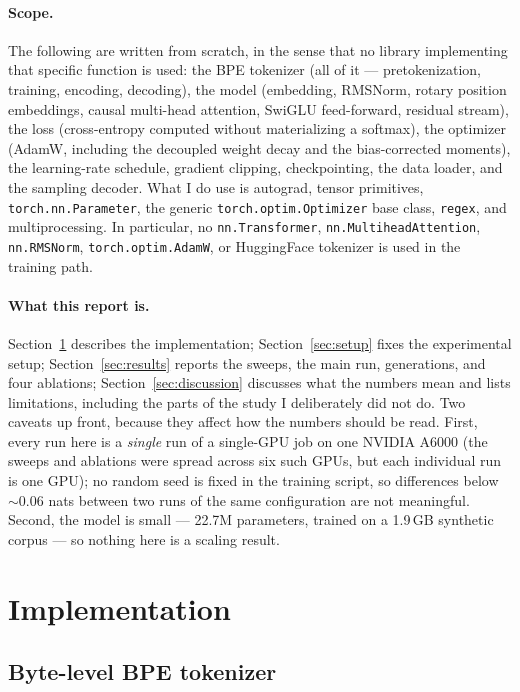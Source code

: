 \documentclass{article}
\begin{document}
\paragraph{Scope.} The following are written from scratch, in the sense that no library implementing that specific function is used: the BPE tokenizer (all of it --- pretokenization, training, encoding, decoding), the model (embedding, RMSNorm, rotary position embeddings, causal multi-head attention, SwiGLU feed-forward, residual stream), the loss (cross-entropy computed without materializing a softmax), the optimizer (AdamW, including the decoupled weight decay and the bias-corrected moments), the learning-rate schedule, gradient clipping, checkpointing, the data loader, and the sampling decoder. What I do use is autograd, tensor primitives, \texttt{torch.nn.Parameter}, the generic \texttt{torch.optim.Optimizer} base class, \texttt{regex}, and multiprocessing. In particular, no \texttt{nn.Transformer}, \texttt{nn.MultiheadAttention}, \texttt{nn.RMSNorm}, \texttt{torch.optim.AdamW}, or HuggingFace tokenizer is used in the training path.

\paragraph{What this report is.} Section~\ref{sec:impl} describes the implementation; Section~\ref{sec:setup} fixes the experimental setup; Section~\ref{sec:results} reports the sweeps, the main run, generations, and four ablations; Section~\ref{sec:discussion} discusses what the numbers mean and lists limitations, including the parts of the study I deliberately did not do. Two caveats up front, because they affect how the numbers should be read. First, every run here is a \emph{single} run of a single-GPU job on one NVIDIA A6000 (the sweeps and ablations were spread across six such GPUs, but each individual run is one GPU); no random seed is fixed in the training script, so differences below $\sim$0.06 nats between two runs of the same configuration are not meaningful. Second, the model is small --- 22.7M parameters, trained on a 1.9\,GB synthetic corpus --- so nothing here is a scaling result.

\section{Implementation}
\label{sec:impl}

\subsection{Byte-level BPE tokenizer}
\end{document}
